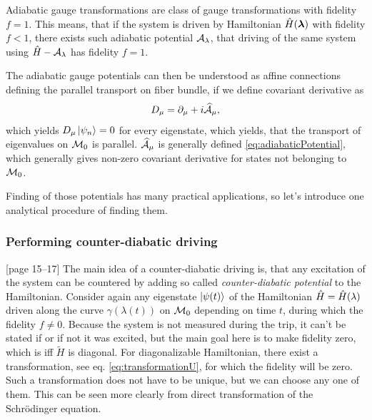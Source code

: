 Adiabatic gauge transformations are  class of gauge transformations with fidelity $f=1$. This means, that if the system is driven by Hamiltonian $\HH(\llambda)$ with fidelity $f<1$, there exists such adiabatic potential $\A_\lambda$, that driving of the same system using $\HH-\A_\lambda$ has fidelity $f=1$.

The adiabatic gauge potentials can then be understood as affine connections defining the parallel transport on fiber bundle, if we define covariant derivative as
\begin{equation}
    D_\mu=\partial_\mu+i\AA_\mu,
\end{equation}
which yields $D_\mu\ket{\psi_n}=0$ for every eigenstate, which yields, that the transport of eigenvalues on $\M_0$ is parallel. $\AA_\mu$ is generally defined \ref{eq:adiabaticPotential}, which generally gives non-zero covariant derivative for states not belonging to $\M_0$. 

Finding of those potentials has many practical applications, so let's introduce one analytical procedure of finding them.






\subsubsection{Performing counter-diabatic driving}
\citep{kolodrubez}[page 15--17] The main idea of a counter-diabatic driving is, that any excitation of the system can be countered by adding so called \emph{counter-diabatic potential} to the Hamiltonian. Consider again any eigenstate $\kpsit$ of the Hamiltonian $\HH=\HH(\lambda)$ driven along the curve $\gamma(\lambda(t))$ on $\M_0$ depending on time $t$, during which the fidelity $f\neq 0$. Because the system is not measured during the trip, it can't be stated if or if not it was excited, but the main goal here is to make fidelity zero, which is iff $\tilde H$ is diagonal. For diagonalizable Hamiltonian, there exist a transformation, see eq. \ref{eq:transformationU}, for which the fidelity will be zero. Such a transformation does not have to be unique, but we can choose any one of them. This can be seen more clearly from direct transformation of the Schrödinger equation. 


